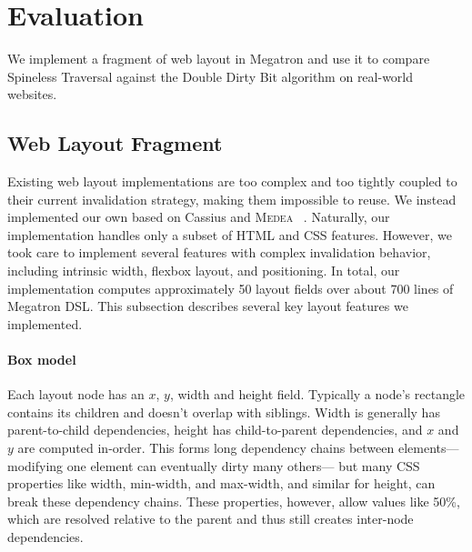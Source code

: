 \section{Evaluation}

We implement a fragment of web layout in Megatron
  and use it to compare Spineless Traversal
  against the Double Dirty Bit algorithm
  on \NumWebsites real-world websites.

\subsection{Web Layout Fragment}
\label{sec:layout-impl}

Existing web layout implementations
  are too complex and too tightly coupled
  to their current invalidation strategy,
  making them impossible to reuse.
We instead implemented our own
  based on Cassius and \textsc{Medea}%
  ~\cite{cassius-1,cassius-2,yufeng-2}.
Naturally, our implementation handles only a subset
  of HTML and CSS features.
However, we took care to implement several features
  with complex invalidation behavior,
  including intrinsic width, flexbox layout, and positioning.
In total, our implementation computes approximately 50 layout fields
  over about 700 lines of Megatron DSL.
This subsection describes several key layout features we implemented.

\paragraph{Box model}
Each layout node has an $x$, $y$, \textsf{width} and \textsf{height} field.
Typically a node's rectangle contains its children
  and doesn't overlap with siblings.
Width is generally has parent-to-child dependencies,
  height has child-to-parent dependencies,
  and $x$ and $y$ are computed in-order.
This forms long dependency chains between elements---%
  modifying one element can eventually dirty many others---%
  but many CSS properties like
  \textsf{width}, \textsf{min-width}, and \textsf{max-width},
  and similar for \textsf{height}, can break these dependency chains.
These properties, however, allow values like \textsf{50\%},
  which are resolved relative to the parent and thus
  still creates inter-node dependencies.
	
